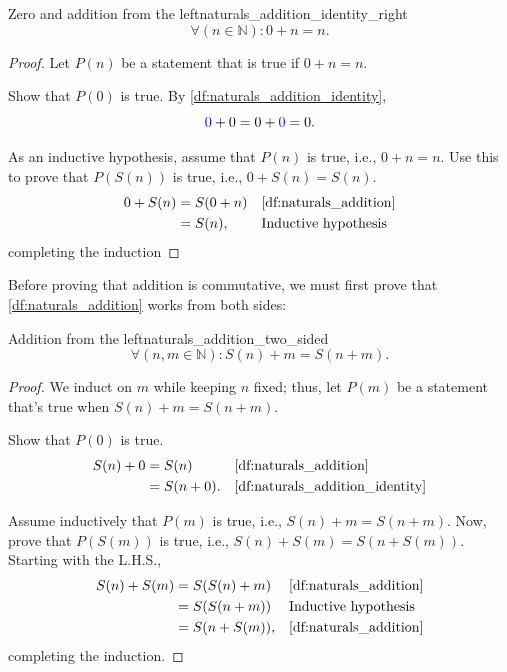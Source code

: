 \begin{lemma}{Zero and addition from the left}{naturals_addition_identity_right}
  \begin{equation*}
    \forall(n \in \mathbb{N}) : 0 + n = n.
  \end{equation*}
\end{lemma}
\begin{proof}
  Let \(P(n)\) be a statement that is true if \(0 + n = n\).

  \basecase Show that \(P(0)\) is true. By \cref{df:naturals_addition_identity},
  \begin{equation}
    {\color{blue}0} + 0 = 0 + {\color{blue}0} = 0.
  \end{equation}

  \inductivestep As an inductive hypothesis, assume that \(P(n)\) is true, i.e., \(0 + n = n\). Use
  this to prove that \(P(S(n))\) is true, i.e., \(0 + S(n) = S(n)\).
  \begin{align}
    0 + S(n) & = S(0 + n) &  & \textrm{\Cref{df:naturals_addition}} \\
             & = S(n),    &  & \textrm{Inductive hypothesis}
  \end{align}
  completing the induction
\end{proof}

Before proving that addition is commutative, we must first prove that \cref{df:naturals_addition}
works from both sides:
\begin{lemma}{Addition from the left}{naturals_addition_two_sided}
  \begin{equation*}
    \forall (n, m \in \mathbb{N}) : S(n) + m = S(n + m).
  \end{equation*}
\end{lemma}
\begin{proof}
  We induct on \(m\) while keeping \(n\) fixed; thus, let \(P(m)\) be a statement that's true when
  \(S(n) + m = S(n + m)\).

  \basecase Show that \(P(0)\) is true.
  \begin{align}
    S(n) + 0 & = S(n)      &  & \textrm{\Cref{df:naturals_addition}}          \\
             & = S(n + 0). &  & \textrm{\Cref{df:naturals_addition_identity}}
  \end{align}

  \inductivestep Assume inductively that \(P(m)\) is true, i.e., \(S(n) + m = S(n + m)\). Now, prove
  that \(P(S(m))\) is true, i.e., \(S(n) + S(m) = S(n + S(m))\). Starting with the L.H.S.,
  \begin{align}
    S(n) + S(m) & = S(S(n) + m)  &  & \textrm{\Cref{df:naturals_addition}} \\
                & = S(S(n + m))  &  & \textrm{Inductive hypothesis}        \\
                & = S(n + S(m)), &  & \textrm{\Cref{df:naturals_addition}}
  \end{align}
  completing the induction.
\end{proof}

